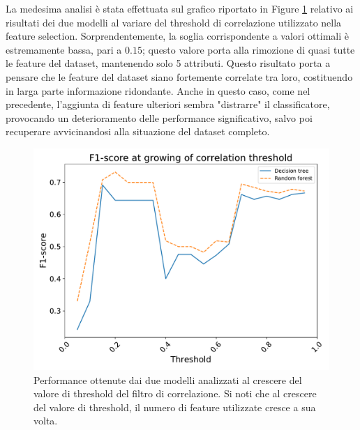 La medesima analisi è stata effettuata sul grafico riportato in Figure \ref{fig:corr-perf} relativo ai risultati dei due modelli al variare del threshold di correlazione utilizzato nella feature selection. Sorprendentemente, la soglia corrispondente a valori ottimali è estremamente bassa, pari a $0.15$; questo valore porta alla rimozione di quasi tutte le feature del dataset, mantenendo solo 5 attributi. Questo risultato porta a pensare che le feature del dataset siano fortemente correlate tra loro, costituendo in larga parte informazione ridondante. Anche in questo caso, come nel precedente, l'aggiunta di feature ulteriori sembra "distrarre" il classificatore, provocando un deterioramento delle performance significativo, salvo poi recuperare avvicinandosi alla situazione del dataset completo.
\begin{figure}
	\centering
	\includegraphics[width=1\linewidth]{images/corr-perf}
	\caption{Performance ottenute dai due modelli analizzati al crescere del valore di threshold del filtro di correlazione. Si noti che al crescere del valore di threshold, il numero di feature utilizzate cresce a sua volta.}
	\label{fig:corr-perf}
\end{figure}

